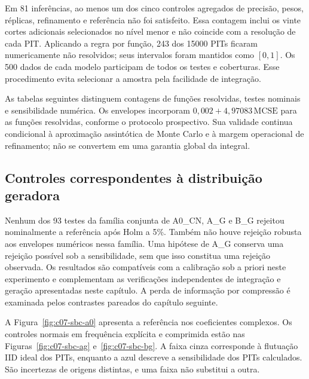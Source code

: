 Em 81 inferências, ao menos um dos cinco controles agregados de
precisão, pesos, réplicas, refinamento e referência não foi satisfeito.
Essa contagem inclui os vinte cortes adicionais selecionados no nível
menor e não coincide com a resolução de cada PIT. Aplicando a regra
por função, 243 dos 15000 PITs ficaram numericamente não resolvidos;
seus intervalos foram mantidos como \([0,1]\). Os 500 dados de cada
modelo participam de todos os testes e coberturas. Esse procedimento evita selecionar a amostra pela facilidade de integração.

As tabelas seguintes distinguem contagens de funções resolvidas,
testes nominais e sensibilidade numérica. Os envelopes incorporam
\(0{,}002+4{,}97083\,\mathrm{MCSE}\) para as funções resolvidas,
conforme o protocolo prospectivo. Sua validade continua condicional
à aproximação assintótica de Monte Carlo e à margem operacional de
refinamento; não se convertem em uma garantia global da integral.



\subsection{Controles correspondentes à distribuição geradora}

Nenhum dos 93 testes da família conjunta de A0\_CN, A\_G e B\_G
rejeitou nominalmente a referência após Holm a 5\%.
Também não houve rejeição robusta aos envelopes numéricos nessa
família. Uma hipótese de A\_G conserva uma rejeição possível sob a
sensibilidade, sem que isso constitua uma rejeição observada.
Os resultados são compatíveis com a calibração sob a priori neste
experimento e complementam as verificações independentes de integração
e geração apresentadas neste capítulo. A perda de informação por
compressão é examinada pelos contrastes pareados do capítulo seguinte.

A Figura~\ref{fig:c07-sbc-a0} apresenta a referência nos coeficientes
complexos. Os controles normais em frequência explícita e comprimida
estão nas Figuras~\ref{fig:c07-sbc-ag} e~\ref{fig:c07-sbc-bg}.
A faixa cinza corresponde à flutuação IID ideal dos PITs, enquanto a
azul descreve a sensibilidade dos PITs calculados. São incertezas de
origens distintas, e uma faixa não substitui a outra.

